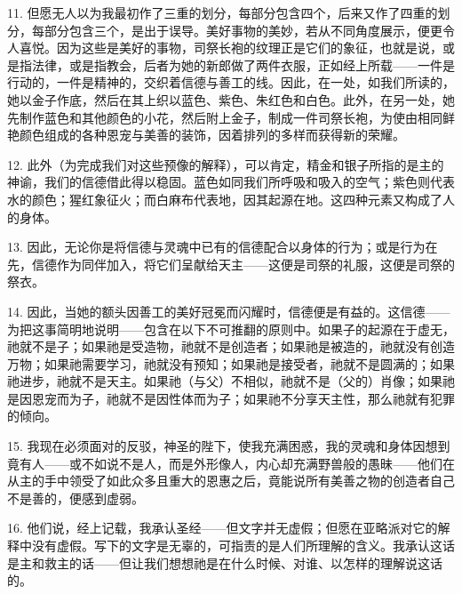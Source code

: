 11. 但愿无人以为我最初作了三重的划分，每部分包含四个，后来又作了四重的划分，每部分包含三个，是出于误导。美好事物的美妙，若从不同角度展示，便更令人喜悦。因为这些是美好的事物，司祭长袍的纹理正是它们的象征，也就是说，或是指法律，或是指教会，后者为她的新郎做了两件衣服，正如经上所载——一件是行动的，一件是精神的，交织着信德与善工的线。因此，在一处，如我们所读的，她以金子作底，然后在其上织以蓝色、紫色、朱红色和白色。此外，在另一处，她先制作蓝色和其他颜色的小花，然后附上金子，制成一件司祭长袍，为使由相同鲜艳颜色组成的各种恩宠与美善的装饰，因着排列的多样而获得新的荣耀。\par

12. 此外（为完成我们对这些预像的解释），可以肯定，精金和银子所指的是主的神谕，我们的信德借此得以稳固。蓝色如同我们所呼吸和吸入的空气；紫色则代表水的颜色；猩红象征火；而白麻布代表地，因其起源在地。这四种元素又构成了人的身体。\par

13. 因此，无论你是将信德与灵魂中已有的信德配合以身体的行为；或是行为在先，信德作为同伴加入，将它们呈献给天主——这便是司祭的礼服，这便是司祭的祭衣。\par

14. 因此，当她的额头因善工的美好冠冕而闪耀时，信德便是有益的。这信德——为把这事简明地说明——包含在以下不可推翻的原则中。如果子的起源在于虚无，祂就不是子；如果祂是受造物，祂就不是创造者；如果祂是被造的，祂就没有创造万物；如果祂需要学习，祂就没有预知；如果祂是接受者，祂就不是圆满的；如果祂进步，祂就不是天主。如果祂（与父）不相似，祂就不是（父的）肖像；如果祂是因恩宠而为子，祂就不是因性体而为子；如果祂不分享天主性，那么祂就有犯罪的倾向。\par

\par

15. 我现在必须面对的反驳，神圣的陛下，使我充满困惑，我的灵魂和身体因想到竟有人——或不如说不是人，而是外形像人，内心却充满野兽般的愚昧——他们在从主的手中领受了如此众多且重大的恩惠之后，竟能说所有美善之物的创造者自己不是善的，便感到虚弱。\par

16. 他们说，经上记载，我承认圣经——但文字并无虚假；但愿在亚略派对它的解释中没有虚假。写下的文字是无辜的，可指责的是人们所理解的含义。我承认这话是主和救主的话——但让我们想想祂是在什么时候、对谁、以怎样的理解说这话的。\par

